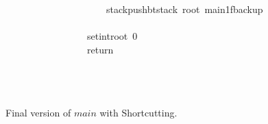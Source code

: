 \documentclass{book}
\theoremstyle{definition}
\newcommand{\Varid}[1]{\mathit{#1}}
\begin{document}
\begin{figure}
\begin{tabbing}
\ttfamily ~~~~~~~~~~~~~~~~~~~~~stackpushbtstack~root~main1fbackup\\
\ttfamily ~~~~~~~~~~~~~~~~~\\
\ttfamily ~~~~~~~~~~~~~~~~~setintroot~0\\
\ttfamily ~~~~~~~~~~~~~~~~~return\\
\ttfamily ~~~~~~~~~~~~~~~~~\\
\ttfamily ~~~~~~~~~\\
\ttfamily ~~~~~
\end{tabbing}
\caption{Final version of \ensuremath{\Varid{main}} with Shortcutting.}
\label{fig:RET3}
\end{figure}
\end{document}

